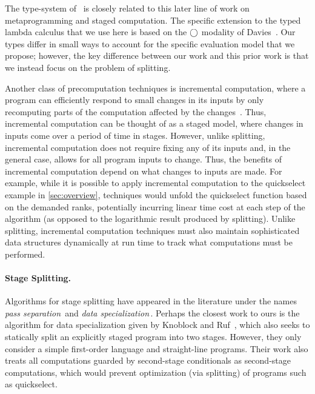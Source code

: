 The type-system of \lang\ is closely related to this later line of
work on metaprogramming and staged computation.  The specific
extension to the typed lambda calculus that we use here is based on
the $\bigcirc$ modality of Davies~\cite{DP01-modal}.  Our types differ in
small ways to account for the specific evaluation model that we
propose; however, the key difference between our work and this prior
work is that we instead focus on the problem of splitting.

Another class of precomputation techniques is incremental computation,
where a program can efficiently respond to small changes in its inputs
by only recomputing parts of the computation affected by the
changes~\cite{DemersReTe81,PughTe89,RamalingamRe93,AcarBlBlHaTa09}.
Thus, incremental computation can be thought of as a staged model,
where changes in inputs come over a period of time in stages.
However, unlike splitting, incremental computation does not require
fixing any of its inputs and, in the general case, allows for all
program inputs to change. Thus, the benefits of incremental
computation depend on what changes to inputs are made. For example,
while it is possible to apply incremental computation to the
quickselect example in \ref{sec:overview}, techniques would unfold the
quickselect function based on the demanded ranks, potentially
incurring linear time cost at each step of the algorithm (as opposed
to the logarithmic result produced by splitting).  Unlike splitting,
incremental computation techniques must also maintain sophisticated
data structures dynamically at run time to track what computations
must be performed.

\paragraph{Stage Splitting.}

Algorithms for stage splitting have appeared in the literature under
the names {\em pass separation}\,\cite{JS86-staging} and {\em data
  specialization}\,\cite{knoblock96}.  Perhaps the closest work to
ours is the algorithm for data specialization given by Knoblock and
Ruf~\cite{knoblock96}, which also seeks to statically split an
explicitly staged program into two stages.  However, they only
consider a simple first-order language and straight-line
programs. Their work also treats all computations guarded by
second-stage conditionals as second-stage computations, which would
prevent optimization (via splitting) of programs such as quickselect.

